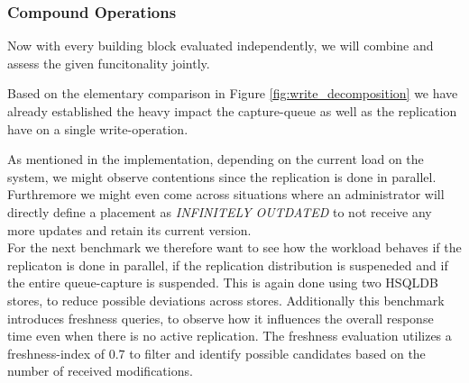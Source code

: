 \subsubsection{Compound Operations} 

Now with every building block evaluated independently, we will combine and assess the given funcitonality jointly.



Based on the elementary comparison in Figure \ref{fig:write_decomposition} we have already established the heavy impact the capture-queue as well as the 
replication have on a single write-operation.

As mentioned in the implementation, depending on the current load on the system, we might observe contentions since the replication is done in parallel.
Furthremore we might even come across situations where an administrator will directly define a placement as \emph{INFINITELY OUTDATED} to not receive any more updates
and retain its current version.\\
For the next benchmark we therefore want to see how the workload behaves if the replicaton is done in parallel, if the replication distribution is suspeneded
and if the entire queue-capture is suspended.
This is again done using two HSQLDB stores, to reduce possible deviations across stores. 
Additionally this benchmark introduces freshness queries, to observe how it influences the overall response time even when there is no active replication. 
The freshness evaluation utilizes a freshness-index of $0.7$ to filter and identify possible candidates based on the number of received modifications.


